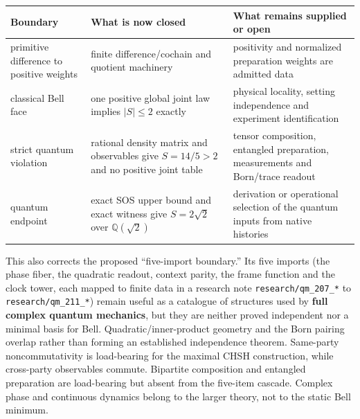 \documentclass[
  11pt,
]{article}
\begin{document}
\begin{longtable}[]{@{}
  >{\raggedright\arraybackslash}p{}
  >{\raggedright\arraybackslash}p{}
  >{\raggedright\arraybackslash}p{}@{}}
\toprule\noalign{}
\begin{minipage}[b]{\linewidth}\raggedright
Boundary
\end{minipage} & \begin{minipage}[b]{\linewidth}\raggedright
What is now closed
\end{minipage} & \begin{minipage}[b]{\linewidth}\raggedright
What remains supplied or open
\end{minipage} \\
\midrule\noalign{}
\endhead
\bottomrule\noalign{}
\endlastfoot
primitive difference to positive weights & finite
difference\allowbreak{}/\allowbreak{}cochain and quotient machinery &
positivity and normalized preparation weights are admitted data \\
classical Bell face & one positive global joint law implies
\(\lvert S\rvert\leq2\) exactly & physical locality, setting
independence and experiment identification \\
strict quantum violation & rational density matrix and observables give
\(S=14/5>2\) and no positive joint table & tensor composition, entangled
preparation, measurements and Born\allowbreak{}/\allowbreak{}trace
readout \\
quantum endpoint & exact SOS upper bound and exact witness give
\(S=2\sqrt2\) over \(\mathbb Q(\sqrt2)\) & derivation or operational
selection of the quantum inputs from native histories \\
\end{longtable}

This also corrects the proposed ``five-import boundary.'' Its five
imports (the phase fiber, the quadratic readout, context parity, the
frame function and the clock tower, each mapped to finite data in a
research note
\texttt{r\allowbreak{}e\allowbreak{}s\allowbreak{}e\allowbreak{}a\allowbreak{}r\allowbreak{}c\allowbreak{}h\allowbreak{}/\allowbreak{}q\allowbreak{}m\allowbreak{}\_\allowbreak{}2\allowbreak{}0\allowbreak{}7\allowbreak{}\_\allowbreak{}*}
to
\texttt{r\allowbreak{}e\allowbreak{}s\allowbreak{}e\allowbreak{}a\allowbreak{}r\allowbreak{}c\allowbreak{}h\allowbreak{}/\allowbreak{}q\allowbreak{}m\allowbreak{}\_\allowbreak{}2\allowbreak{}1\allowbreak{}1\allowbreak{}\_\allowbreak{}*})
remain useful as a catalogue of structures used by \textbf{full complex
quantum mechanics}, but they are neither proved independent nor a
minimal basis for Bell.
Quadratic\allowbreak{}/\allowbreak{}inner-product geometry and the Born
pairing overlap rather than forming an established independence theorem.
Same-party noncommutativity is load-bearing for the maximal CHSH
construction, while cross-party observables commute. Bipartite
composition and entangled preparation are load-bearing but absent from
the five-item cascade. Complex phase and continuous dynamics belong to
the larger theory, not to the static Bell minimum.
\end{document}
